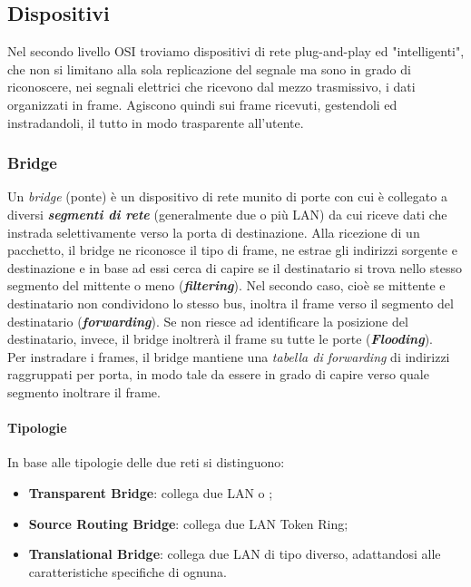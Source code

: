 \documentclass[a4paper, twoside]{article}
\def\subsub#1{\subsubsection{#1}\label{#1}}
\def\para#1{\paragraph{#1}\label{#1}}
\def\vedi#1{\nameref{#1}}
\begin{document}
\subsection{Dispositivi}  %
Nel secondo livello OSI troviamo dispositivi di rete plug-and-play ed "intelligenti", che non si limitano alla sola replicazione del segnale ma sono in grado di riconoscere, nei segnali elettrici che ricevono dal mezzo trasmissivo, i dati organizzati in frame. Agiscono quindi sui frame ricevuti, gestendoli ed instradandoli, il tutto in modo trasparente all'utente.
\subsub{Bridge} Un \textit{bridge} (ponte) è un dispositivo di rete munito di porte con cui è collegato a diversi \textbf{\textit{segmenti di rete}} (generalmente due o più LAN) da cui riceve dati che instrada selettivamente verso la porta di destinazione. Alla ricezione di un pacchetto, il bridge ne riconosce il tipo di frame, ne estrae gli indirizzi sorgente e destinazione e in base ad essi cerca di capire se il destinatario si trova nello stesso segmento del mittente o meno (\textit{\textbf{filtering}}). Nel secondo caso, cioè se mittente e destinatario non condividono lo stesso bus, inoltra il frame verso il segmento del destinatario (\textbf{\textit{forwarding}}). Se non riesce ad identificare la posizione del destinatario, invece, il bridge inoltrerà il frame su tutte le porte (\textbf{\textit{Flooding}}). \\Per instradare i frames, il bridge mantiene una \textit{tabella di forwarding} di indirizzi \vedi{MAC} raggruppati per porta, in modo tale da essere in grado di capire verso quale segmento inoltrare il frame. 
\para{Tipologie} In base alle tipologie delle due reti si distinguono:
\begin{itemize}
\item \textbf{Transparent Bridge}: collega due LAN \vedi{Ethernet} o \vedi{IEEE 802.3};
\item \textbf{Source Routing Bridge}: collega due LAN Token Ring;
\item \textbf{Translational Bridge}: collega due LAN di tipo diverso, adattandosi alle caratteristiche specifiche di ognuna.
\end{itemize}
\end{document}
